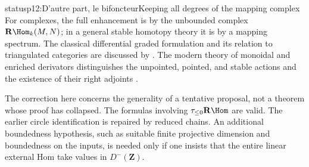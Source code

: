\begin{dcomment}{status}{p12:D’autre part, le bifoncteur}{Keeping all degrees of the mapping complex}
For complexes, the full enhancement is by the unbounded complex \(\mathbf R\Hom_k(M,N)\); in a general stable homotopy theory it is by a mapping spectrum. The classical differential graded formulation and its relation to triangulated categories are discussed by \citet[Sections 2--3]{Keller2006DG}. The modern theory of monoidal and enriched derivators distinguishes the unpointed, pointed, and stable actions and the existence of their right adjoints \citep[Sections 3 and 8--9]{GrothPontoShulman2014Additivity}.

The correction here concerns the generality of a tentative proposal, not a theorem whose proof has collapsed. The formulas involving \(\tau_{\leq0}\mathbf R\Hom\) are valid. The earlier circle identification is repaired by reduced chains. An additional boundedness hypothesis, such as suitable finite projective dimension and boundedness on the inputs, is needed only if one insists that the entire linear external Hom take values in \(D^-(\mathbf Z)\).
\end{dcomment}

